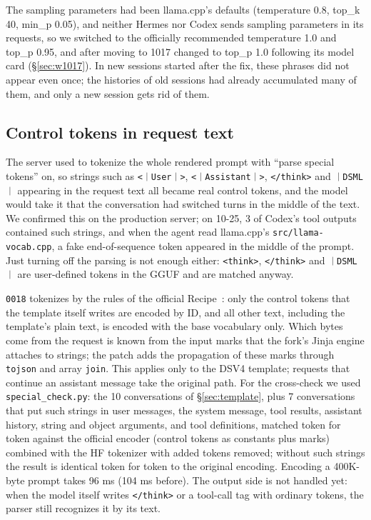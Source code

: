 \documentclass[11pt,a4paper]{article}
\newcommand{\code}[1]{\texttt{#1}}
\newcommand{\ctok}[1]{\mbox{\xeCJKsetup{CJKecglue={}}\code{#1}}}
\begin{document}
The sampling parameters had been llama.cpp's defaults (temperature 0.8, top\_k 40, min\_p 0.05), and neither Hermes nor Codex sends sampling parameters in its requests, so we switched to the officially recommended temperature 1.0 and top\_p 0.95, and after moving to 1017 changed to top\_p 1.0 following its model card (\S\ref{sec:w1017}). In new sessions started after the fix, these phrases did not appear even once; the histories of old sessions had already accumulated many of them, and only a new session gets rid of them.

\subsection{Control tokens in request text}
\label{sec:special}

The server used to tokenize the whole rendered prompt with ``parse special tokens'' on, so strings such as \ctok{<｜User｜>}, \ctok{<｜Assistant｜>}, \code{</think>} and \ctok{｜DSML｜} appearing in the request text all became real control tokens, and the model would take it that the conversation had switched turns in the middle of the text. We confirmed this on the production server; on 10-25, 3 of Codex's tool outputs contained such strings, and when the agent read llama.cpp's \code{src/llama-vocab.cpp}, a fake end-of-sequence token appeared in the middle of the prompt. Just turning off the parsing is not enough either: \code{<think>}, \code{</think>} and \ctok{｜DSML｜} are user-defined tokens in the GGUF and are matched anyway.

\code{0018} tokenizes by the rules of the official Recipe~\cite{recipe}: only the control tokens that the template itself writes are encoded by ID, and all other text, including the template's plain text, is encoded with the base vocabulary only. Which bytes come from the request is known from the input marks that the fork's Jinja engine attaches to strings; the patch adds the propagation of these marks through \code{tojson} and array \code{join}. This applies only to the DSV4 template; requests that continue an assistant message take the original path. For the cross-check we used \code{special\_check.py}: the 10 conversations of \S\ref{sec:template}, plus 7 conversations that put such strings in user messages, the system message, tool results, assistant history, string and object arguments, and tool definitions, matched token for token against the official encoder (control tokens as constants plus marks) combined with the HF tokenizer with added tokens removed; without such strings the result is identical token for token to the original encoding. Encoding a 400K-byte prompt takes 96 ms (104 ms before). The output side is not handled yet: when the model itself writes \code{</think>} or a tool-call tag with ordinary tokens, the parser still recognizes it by its text.
\end{document}
